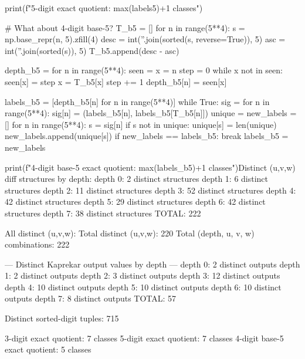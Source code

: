 {{{{{{{{{{{{{print(f"5-digit exact quotient: {max(labels5)+1} classes")

# What about 4-digit base-5?
T_b5 = []
for n in range(5**4):
    s = np.base_repr(n, 5).zfill(4)
    desc = int(''.join(sorted(s, reverse=True)), 5)
    asc = int(''.join(sorted(s)), 5)
    T_b5.append(desc - asc)

depth_b5 = {}
for n in range(5**4):
    seen = {}
    x = n
    step = 0
    while x not in seen:
        seen[x] = step
        x = T_b5[x]
        step += 1
    depth_b5[n] = seen[x]

labels_b5 = [depth_b5[n] for n in range(5**4)]
while True:
    sig = {}
    for n in range(5**4):
        sig[n] = (labels_b5[n], labels_b5[T_b5[n]])
    unique = {}
    new_labels = []
    for n in range(5**4):
        s = sig[n]
        if s not in unique:
            unique[s] = len(unique)
        new_labels.append(unique[s])
    if new_labels == labels_b5:
        break
    labels_b5 = new_labels

print(f"4-digit base-5 exact quotient: {max(labels_b5)+1} classes")Distinct (u,v,w) diff structures by depth:
  depth 0: 2 distinct structures
  depth 1: 6 distinct structures
  depth 2: 11 distinct structures
  depth 3: 52 distinct structures
  depth 4: 42 distinct structures
  depth 5: 29 distinct structures
  depth 6: 42 distinct structures
  depth 7: 38 distinct structures
  TOTAL: 222

All distinct (u,v,w):
Total distinct (u,v,w): 220
Total (depth, u, v, w) combinations: 222

--- Distinct Kaprekar output values by depth ---
  depth 0: 2 distinct outputs
  depth 1: 2 distinct outputs
  depth 2: 3 distinct outputs
  depth 3: 12 distinct outputs
  depth 4: 10 distinct outputs
  depth 5: 10 distinct outputs
  depth 6: 10 distinct outputs
  depth 7: 8 distinct outputs
  TOTAL: 57

Distinct sorted-digit tuples: 715

3-digit exact quotient: 7 classes
5-digit exact quotient: 7 classes
4-digit base-5 exact quotient: 5 classes

}}}}}}}}}}}}}
